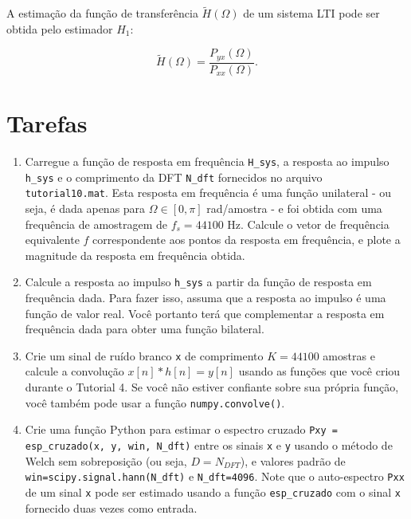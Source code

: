 \documentclass[a4paper,twoside,12pt]{article}
\begin{document}
	A estimação da função de transferência $\widetilde{H}(\Omega)$ de um sistema LTI pode ser obtida pelo estimador $H_1$:
	
	\begin{equation}
		\widetilde{H}(\Omega) = \frac{P_{yx}(\Omega)}{P_{xx}(\Omega)}.
	\end{equation}
	
	\section{Tarefas}
	\begin{enumerate}
		\item Carregue a função de resposta em frequência {\tt H\_sys}, a resposta ao impulso {\tt h\_sys} e o comprimento da DFT {\tt N\_dft} fornecidos no arquivo {\tt tutorial10.mat}. Esta resposta em frequência é uma função unilateral - ou seja, é dada apenas para $\Omega \in [0, \pi]$ rad/amostra - e foi obtida com uma frequência de amostragem de $f_s = 44100$ Hz. Calcule o vetor de frequência equivalente $f$ correspondente aos pontos da resposta em frequência, e plote a magnitude da resposta em frequência obtida.
		
		\item Calcule a resposta ao impulso {\tt h\_sys} a partir da função de resposta em frequência dada. Para fazer isso, assuma que a resposta ao impulso é uma função de valor real. Você portanto terá que complementar a resposta em frequência dada para obter uma função bilateral.
		
		\item Crie um sinal de ruído branco {\tt x} de comprimento $K = 44100$ amostras e calcule a convolução $x[n] \ast h[n] = y[n]$ usando as funções que você criou durante o Tutorial 4. Se você não estiver confiante sobre sua própria função, você também pode usar a função {\tt numpy.convolve()}. 
		
		\item Crie uma função Python para estimar o espectro cruzado {\tt Pxy = esp\_cruzado(x, y, win, N\_dft)} entre os sinais {\tt x} e {\tt y} usando o método de Welch sem sobreposição (ou seja, $D = N_{DFT}$), e valores padrão de {\tt win=scipy.signal.hann(N\_dft)} e {\tt N\_dft=4096}. Note que o auto-espectro {\tt Pxx} de um sinal {\tt x} pode ser estimado usando a função {\tt esp\_cruzado} com o sinal {\tt x} fornecido duas vezes como entrada.
		

\end{enumerate}
\end{document}
